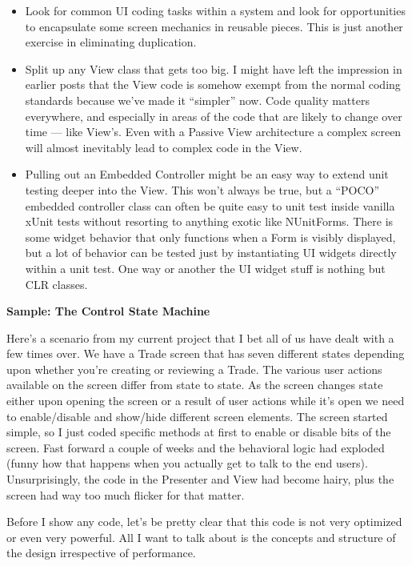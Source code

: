 \documentclass{article}
\begin{document}
{ \begin{itemize}
    \item  Look for common UI coding tasks within a system and look for opportunities to encapsulate some screen mechanics in reusable pieces.  This is just another exercise in eliminating duplication.  
 \item  Split up any View class that gets too big.  I might have left the impression in earlier posts that the View code is somehow exempt from the normal coding standards because we've made it “simpler” now.  Code quality matters everywhere, and especially in areas of the code that are likely to change over time — like View's.  Even with a Passive View architecture a complex screen will almost inevitably lead to complex code in the View.  
 \item  Pulling out an Embedded Controller might be an easy way to extend unit testing deeper into the View.  This won't always be true, but a “POCO” embedded controller class can often be quite easy to unit test inside vanilla xUnit tests without resorting to anything exotic like NUnitForms.  There is some widget behavior that only functions when a Form is visibly displayed, but a lot of behavior can be tested just by instantiating UI widgets directly within a unit test.  One way or another the UI widget stuff is nothing but CLR classes.  
 \end{itemize}
 
\Large {\textbf{Sample:  The Control State Machine}}

Here's a scenario from my current project that I bet all of us have dealt with a few times over.  We have a Trade screen that has seven different states depending upon whether you're creating or reviewing a Trade.  The various user actions available on the screen differ from state to state.  As the screen changes state either upon opening the screen or a result of user actions while it's open we need to enable/disable and show/hide different screen elements.  The screen started simple, so I just coded specific methods at first to enable or disable bits of the screen.  Fast forward a couple of weeks and the behavioral logic had exploded (funny how that happens when you actually get to talk to the end users).  Unsurprisingly, the code in the Presenter and View had become hairy, plus the screen had way too much flicker for that matter. 

Before I show any code, let's be pretty clear that this code is not very optimized or even very powerful.  All I want to talk about is the concepts and structure of the design irrespective of performance.

}
\end{document}
